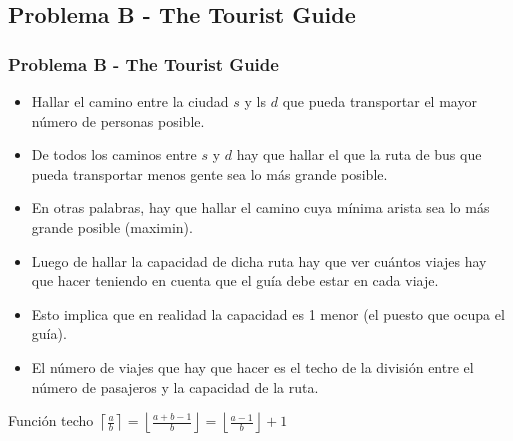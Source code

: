 \documentclass{beamer}
\begin{document}
	\subsection{Problema B - The Tourist Guide}
	\begin{frame}
		\frametitle{Problema B - The Tourist Guide}
		\begin{itemize}
			\item Hallar el camino entre la ciudad $s$ y ls $d$ que pueda transportar el mayor número de personas posible.
			\item De todos los caminos entre $s$ y $d$ hay que hallar el que la ruta de bus que pueda transportar menos gente sea lo más grande posible.
			\item En otras palabras, hay que hallar el camino cuya mínima arista sea lo más grande posible (maximin).
		\end{itemize}
	\end{frame}
	
	\begin{frame}
		\begin{itemize}
			\item Luego de hallar la capacidad de dicha ruta hay que ver cuántos viajes hay que hacer teniendo en cuenta que el guía debe estar en cada viaje.
			\item Esto implica que en realidad la capacidad es 1 menor (el puesto que ocupa el guía).
			\item El número de viajes que hay que hacer es el techo de la división entre el número de pasajeros y la capacidad de la ruta.
		\end{itemize}
		\begin{block}{Función techo}
			$\displaystyle \left\lceil \frac{a}{b} \right\rceil = \left\lfloor \frac{a + b - 1}{b} \right\rfloor = \left\lfloor \frac{a - 1}{b} \right\rfloor + 1$
		\end{block}
	\end{frame}
	
\end{document}

